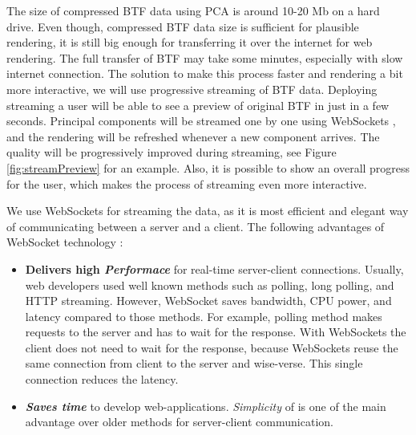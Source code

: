 The size of compressed BTF data using PCA is around 10-20 Mb on a hard drive. 
Even though, compressed BTF data size is sufficient for plausible rendering, it is still big enough for transferring it over the internet for web rendering.
The full transfer of BTF may take some minutes, especially with slow internet connection. The solution to make this process faster and rendering a bit more interactive, we will use progressive streaming of BTF data.
Deploying streaming a user will be able to see a preview of original BTF in just in a few seconds. 
Principal components will be streamed one by one using WebSockets \cite{websockets}, and the rendering will be refreshed whenever a new component arrives.
The quality will be progressively improved during streaming, see Figure \ref{fig:streamPreview} for an example. Also, it is possible to show an overall progress for the user, which makes the process of streaming even more interactive.


We use WebSockets for streaming the data, as it is most efficient and elegant way of communicating between a server and a client.
The following advantages of WebSocket technology \cite[Ch.\ 1]{websockets}:

\begin{itemize}
  \item \textbf{Delivers high \emph{Performace}}  for real-time server-client connections. 
  Usually, web developers used well known methods such as polling, long polling, and HTTP streaming. However, WebSocket saves bandwidth, CPU power, and latency compared to those methods.
  For example, polling method makes requests to the server and has to wait for the response.
  With WebSockets the client does not need to wait for the response, because WebSockets reuse the same connection from client to the server and wise-verse.
  This single connection reduces the latency.

  \item \textbf{\emph{Saves time}} to develop web-applications. \emph{Simplicity} of is one of the main advantage over older methods for server-client communication.
  
\end{itemize}

